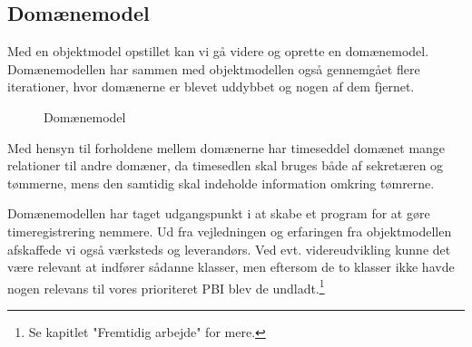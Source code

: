 \subsection{Domænemodel}

Med en objektmodel opstillet kan vi gå videre og oprette en domænemodel.
Domænemodellen har sammen med objektmodellen også gennemgået flere iterationer, hvor domænerne er blevet uddybbet og nogen af dem fjernet.

\begin{figure}[H]
    \caption{Domænemodel}
    \label{fig:DomaeneModelSprint2}
\end{figure} 

Med hensyn til forholdene mellem domænerne har timeseddel domænet mange relationer til andre domæner, da timesedlen skal bruges både af sekretæren og tømmerne, mens den samtidig skal indeholde information omkring tømrerne.

Domænemodellen har taget udgangspunkt i at skabe et program for at gøre timeregistrering nemmere. Ud fra vejledningen og erfaringen fra objektmodellen afskaffede vi også værksteds og leverandørs. Ved evt. videreudvikling kunne det være relevant at indfører sådanne klasser, men eftersom de to klasser ikke havde nogen relevans til vores prioriteret PBI blev de undladt.\footnote{Se kapitlet "Fremtidig arbejde" for mere.}
